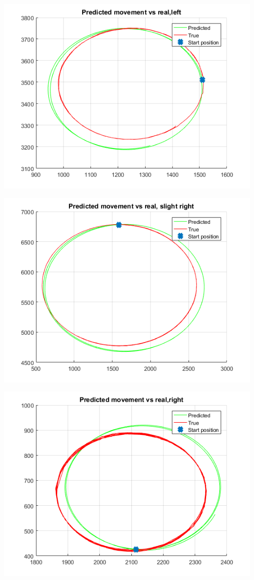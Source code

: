 \documentclass[a4paper, 12pt]{article}
\begin{document}
\includegraphics[scale = 1]{gll.png}

\includegraphics[scale = 1]{gr.png}

\includegraphics[scale = 1]{grr.png}
\end{document}
